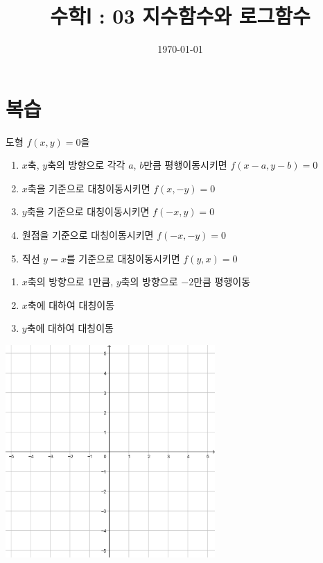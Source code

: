 \documentclass{oblivoir}
\begin{document}
\title{수학Ⅰ : 03 지수함수와 로그함수}
\author{}
\date{\today}
\maketitle
\tableofcontents
\newpage

\section{복습}

\begin{mdframed}
%
\label{review1}
도형 \(f(x,y)=0\)을
\begin{enumerate}
\item
\(x\)축, \(y\)축의 방향으로 각각 \(a\), \(b\)만큼 평행이동시키면 \(f(x-a,y-b)=0\)
\item
\(x\)축을 기준으로 대칭이동시키면 \(f(x,-y)=0\)
\item
\(y\)축을 기준으로 대칭이동시키면 \(f(-x,y)=0\)
\item
원점을 기준으로 대칭이동시키면 \(f(-x,-y)=0\)
\item
직선 \(y=x\)를 기준으로 대칭이동시키면 \(f(y,x)=0\)
\end{enumerate}
\end{mdframed}

%
\label{review2}
\begin{enumerate}
\item
\(x\)축의 방향으로 1만큼, \(y\)축의 방향으로 \(-2\)만큼 평행이동
\item
\(x\)축에 대하여 대칭이동
\item
\(y\)축에 대하여 대칭이동
\end{enumerate}
\begin{center}
\includegraphics[width=0.6\textwidth]{55grid}
\end{center}
\end{document}

